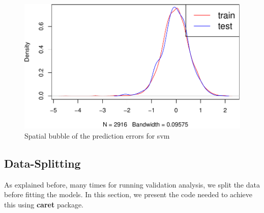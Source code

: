 \documentclass[10pt,b5paper,]{book}
\newenvironment{Shaded}{\begin{snugshade}}{\end{snugshade}}
\newcommand{\CommentTok}[1]{\textcolor[rgb]{0.56,0.35,0.01}{\textit{#1}}}
\newcommand{\DataTypeTok}[1]{\textcolor[rgb]{0.13,0.29,0.53}{#1}}
\newcommand{\DecValTok}[1]{\textcolor[rgb]{0.00,0.00,0.81}{#1}}
\newcommand{\KeywordTok}[1]{\textcolor[rgb]{0.13,0.29,0.53}{\textbf{#1}}}
\newcommand{\NormalTok}[1]{#1}
\newcommand{\OperatorTok}[1]{\textcolor[rgb]{0.81,0.36,0.00}{\textbf{#1}}}
\newcommand{\StringTok}[1]{\textcolor[rgb]{0.31,0.60,0.02}{#1}}
\theoremstyle{definition}
\theoremstyle{definition}
\theoremstyle{definition}
\theoremstyle{remark}
\begin{document}
\begin{Shaded}
\end{Shaded}

\begin{figure}
\centering
\includegraphics{SOCMapping_files/figure-latex/unnamed-chunk-91-1.pdf}
\caption{\label{fig:unnamed-chunk-91}Spatial bubble of the prediction errors
for svm}
\end{figure}

\hypertarget{dataSplit}{%
\subsection{Data-Splitting}\label{dataSplit}}

As explained before, many times for running validation analysis, we
split the data before fitting the models. In this section, we present
the code needed to achieve this using \textbf{caret} package.
\end{document}
